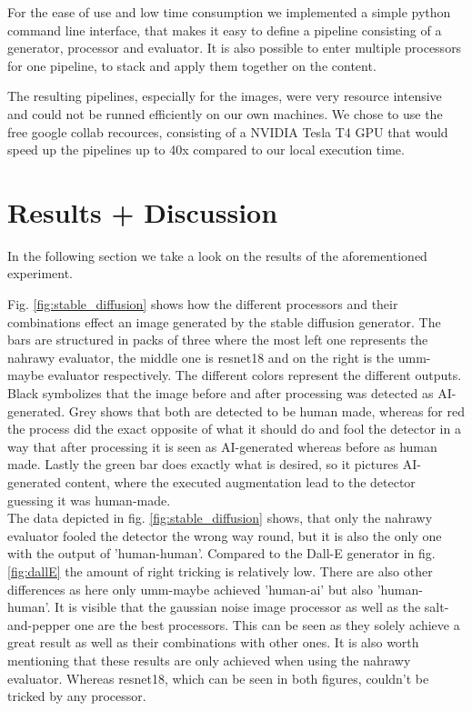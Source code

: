 \documentclass{article} %
\begin{document}
For the ease of use and low time consumption we implemented a simple python command line interface, that makes it easy to define a pipeline consisting of a generator, processor and evaluator. It is also possible to enter multiple processors for one pipeline, to stack and apply them together on the content.

The resulting pipelines, especially for the images, were very resource intensive and could not be runned efficiently on our own machines. We chose to use the free google collab recources, consisting of a NVIDIA Tesla T4 GPU that would speed up the pipelines up to 40x compared to our local execution time. 

\section{Results + Discussion}
In the following section we take a look on the results of the aforementioned experiment.


Fig. \ref{fig:stable_diffusion} shows how the different processors and their combinations effect an image generated by the stable diffusion generator. The bars are structured in packs of three where the most left one represents the nahrawy evaluator, the middle one is resnet18 and on the right is the umm-maybe evaluator respectively. The different colors represent the different outputs. Black symbolizes that the image before and after processing was detected as AI-generated. Grey shows that both are detected to be human made, whereas for red the process did the exact opposite of what it should do and fool the detector in a way that after processing it is seen as AI-generated whereas before as human made. Lastly the green bar does exactly what is desired, so it pictures AI-generated content, where the executed augmentation lead to the detector guessing it was human-made. \\
The data depicted in fig. \ref{fig:stable_diffusion} shows, that only the nahrawy evaluator fooled the detector the wrong way round, but it is also the only one with the output of 'human-human'. Compared to the Dall-E generator in fig. \ref{fig:dallE} the amount of right tricking is relatively low. There are also other differences as here only umm-maybe achieved 'human-ai' but also 'human-human'.
It is visible that the gaussian noise image processor as well as the salt-and-pepper one are the best processors. This can be seen as they solely achieve a great result as well as their combinations with other ones. It is also worth mentioning that these results are only achieved when using the nahrawy evaluator. Whereas resnet18, which can be seen in both figures, couldn't be tricked by any processor.
\end{document}
